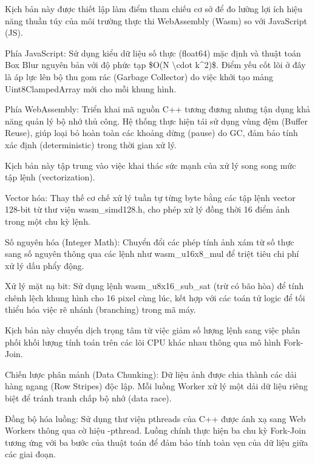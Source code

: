 
Kịch bản này được thiết lập làm điểm tham chiếu cơ sở để đo lường lợi ích hiệu năng thuần túy của môi trường thực thi WebAssembly (Wasm) so với JavaScript (JS).


Phía JavaScript: Sử dụng kiểu dữ liệu số thực (float64) mặc định và thuật toán Box Blur nguyên bản với độ phức tạp \$O(N \textbackslash{}cdot k\textasciicircum{}2)\$. Điểm yếu cốt lõi ở đây là áp lực lên bộ thu gom rác (Garbage Collector) do việc khởi tạo mảng Uint8ClampedArray mới cho mỗi khung hình.


Phía WebAssembly: Triển khai mã nguồn C++ tương đương nhưng tận dụng khả năng quản lý bộ nhớ thủ công. Hệ thống thực hiện tái sử dụng vùng đệm (Buffer Reuse), giúp loại bỏ hoàn toàn các khoảng dừng (pause) do GC, đảm bảo tính xác định (deterministic) trong thời gian xử lý.



Kịch bản này tập trung vào việc khai thác sức mạnh của xử lý song song mức tập lệnh (vectorization).


Vector hóa: Thay thế cơ chế xử lý tuần tự từng byte bằng các tập lệnh vector 128-bit từ thư viện wasm\_simd128.h, cho phép xử lý đồng thời 16 điểm ảnh trong một chu kỳ lệnh.


Số nguyên hóa (Integer Math): Chuyển đổi các phép tính ảnh xám từ số thực sang số nguyên thông qua các lệnh như wasm\_u16x8\_mul để triệt tiêu chi phí xử lý dấu phẩy động.


Xử lý mặt nạ bit: Sử dụng lệnh wasm\_u8x16\_sub\_sat (trừ có bão hòa) để tính chênh lệch khung hình cho 16 pixel cùng lúc, kết hợp với các toán tử logic để tối thiểu hóa việc rẽ nhánh (branching) trong mã máy.



Kịch bản này chuyển dịch trọng tâm từ việc giảm số lượng lệnh sang việc phân phối khối lượng tính toán trên các lõi CPU khác nhau thông qua mô hình Fork-Join.


Chiến lược phân mảnh (Data Chunking): Dữ liệu ảnh được chia thành các dải hàng ngang (Row Stripes) độc lập. Mỗi luồng Worker xử lý một dải dữ liệu riêng biệt để tránh tranh chấp bộ nhớ (data race).


Đồng bộ hóa luồng: Sử dụng thư viện pthreads của C++ được ánh xạ sang Web Workers thông qua cờ hiệu -pthread. Luồng chính thực hiện ba chu kỳ Fork-Join tương ứng với ba bước của thuật toán để đảm bảo tính toàn vẹn của dữ liệu giữa các giai đoạn.


